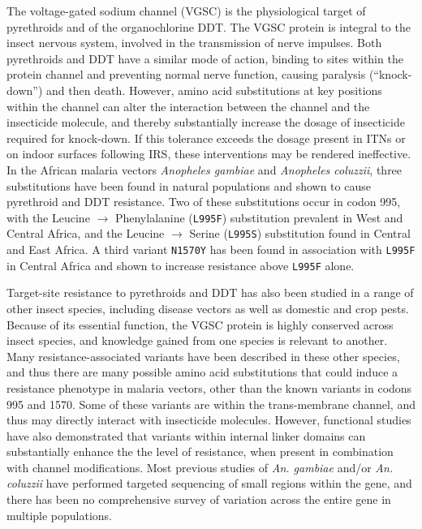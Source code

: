 \documentclass[a4paper,11pt,abstracton]{scrartcl}
\begin{document}
%
The voltage-gated sodium channel (VGSC) is the physiological target of pyrethroids and of the organochlorine DDT.
%
The VGSC protein is integral to the insect nervous system, involved in the transmission of nerve impulses.
%
Both pyrethroids and DDT have a similar mode of action, binding to sites within the protein channel and preventing normal nerve function, causing paralysis (``knock-down'') and then death.
%
However, amino acid substitutions at key positions within the channel can alter the interaction between the channel and the insecticide molecule, and thereby substantially increase the dosage of insecticide required for knock-down.
%
If this tolerance exceeds the dosage present in ITNs or on indoor surfaces following IRS, these interventions may be rendered ineffective.
%
In the African malaria vectors \emph{Anopheles gambiae} and \emph{Anopheles coluzzii}, three substitutions have been found in natural populations and shown to cause pyrethroid and DDT resistance.
%
Two of these substitutions occur in codon 995\footnotemark, with the Leucine $\rightarrow$ Phenylalanine (\texttt{L995F}) substitution prevalent in West and Central Africa, and the Leucine $\rightarrow$ Serine (\texttt{L995S}) substitution found in Central and East Africa.
%
%
A third variant \texttt{N1570Y} has been found in association with \texttt{L995F} in Central Africa and shown to increase resistance above \texttt{L995F} alone.


%
Target-site resistance to pyrethroids and DDT has also been studied in a range of other insect species, including disease vectors as well as domestic and crop pests.
%
Because of its essential function, the VGSC protein is highly conserved across insect species, and knowledge gained from one species is relevant to another.
%
Many resistance-associated variants have been described in these other species, and thus there are many possible amino acid substitutions that could induce a resistance phenotype in malaria vectors, other than the known variants in codons 995 and 1570.
%
Some of these variants are within the trans-membrane channel, and thus may directly interact with insecticide molecules.
%
However, functional studies have also demonstrated that variants within internal linker domains can substantially enhance the the level of resistance, when present in combination with channel modifications.
%
Most previous studies of \emph{An. gambiae} and/or \emph{An. coluzzii} have performed targeted sequencing of small regions within the gene, and there has been no comprehensive survey of variation across the entire gene in multiple populations.
\end{document}
